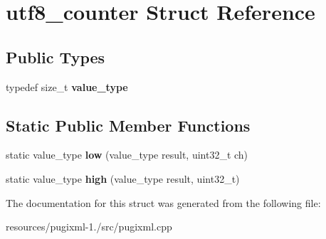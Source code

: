 \hypertarget{structutf8__counter}{\section{utf8\+\_\+counter Struct Reference}
\label{structutf8__counter}
}
\subsection*{Public Types}
\begin{DoxyCompactItemize}
\item 
\hypertarget{structutf8__counter_adb65152c007965c42184614da9c4af1b}{typedef size\+\_\+t {\bfseries value\+\_\+type}}\label{structutf8__counter_adb65152c007965c42184614da9c4af1b}

\end{DoxyCompactItemize}
\subsection*{Static Public Member Functions}
\begin{DoxyCompactItemize}
\item 
\hypertarget{structutf8__counter_a0950643189089175ae0eac9b4193534d}{static value\+\_\+type {\bfseries low} (value\+\_\+type result, uint32\+\_\+t ch)}\label{structutf8__counter_a0950643189089175ae0eac9b4193534d}

\item 
\hypertarget{structutf8__counter_ab16e675980a15e1ede2e4cd18d19f7b1}{static value\+\_\+type {\bfseries high} (value\+\_\+type result, uint32\+\_\+t)}\label{structutf8__counter_ab16e675980a15e1ede2e4cd18d19f7b1}

\end{DoxyCompactItemize}


The documentation for this struct was generated from the following file\+:\begin{DoxyCompactItemize}
\item 
resources/pugixml-\/1./src/pugixml.\+cpp\end{DoxyCompactItemize}
